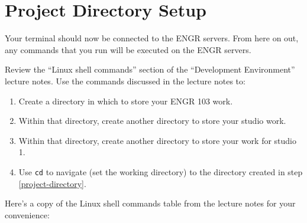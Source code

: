 \documentclass{article}
\begin{document}
\section{Project Directory Setup}

Your terminal should now be connected to the ENGR servers. From here on out, any commands that you run will be executed on the ENGR servers.

Review the ``Linux shell commands'' section of the ``Development Environment'' lecture notes. Use the commands discussed in the lecture notes to:

\begin{enumerate}
\item Create a directory in which to store your ENGR 103 work.
\item Within that directory, create another directory to store your studio work.
\item \label{project-directory} Within that directory, create another directory to store your work for studio 1.
\item Use \texttt{cd} to navigate (set the working directory) to the directory created in step \ref{project-directory}.
\end{enumerate}

Here's a copy of the Linux shell commands table from the lecture notes for your convenience:
\end{document}
